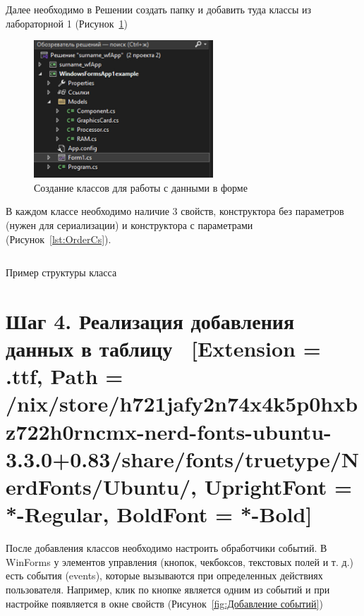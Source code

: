 \documentclass[12pt]{article}
\newcommand{\icon}[1]{\fontspec{UbuntuNerdFont}[Extension = .ttf,
  Path = /nix/store/h721jafy2n74x4k5p0hxbz722h0rncmx-nerd-fonts-ubuntu-3.3.0+0.83/share/fonts/truetype/NerdFonts/Ubuntu/,
  UprightFont = *-Regular,
BoldFont = *-Bold] #1}
\newcommand{\iicon}[1]{{\icon{#1}}}
\renewcommand{\texttt}[1]{{\small\ttfamily #1}}
\numberwithin{listing}{section}
\numberwithin{figure}{section}
\begin{document}
Далее необходимо в Решении создать папку и добавить туда классы из лабораторной 1 (Рисунок~\ref{fig:Создание классов для работы с данными в форме})

\begin{figure}[H]
	\centering
	\includegraphics[width=0.6\textwidth]{fig/image 5.jpg}
	\caption{Создание классов для работы с данными в форме}
	\label{fig:Создание классов для работы с данными в форме}
\end{figure}

В каждом классе необходимо наличие 3 свойств, конструктора без параметров (нужен для сериализации) и конструктора с параметрами (Рисунок~\ref{lst:OrderCs}).

\begin{listing}[H]
	\inputminted[firstline = 9]{csharp}{../../2lab/surname_wfApp/Models/Component.cs}
	\caption{Пример структуры класса}
	\label{lst:OrderCs}
\end{listing}

\newpage

\section{Шаг 4. Реализация добавления данных в таблицу \ \texorpdfstring{{\small{\iicon{}}}}{}}

После добавления классов необходимо настроить обработчики событий.
В \texttt{WinForms} у элементов управления (кнопок, чекбоксов, текстовых полей и т. д.) есть события (\texttt{events}), которые вызываются при определенных действиях пользователя.
Например, клик по кнопке является одним из событий и при настройке появляется в окне свойств (Рисунок~\ref{fig:Добавление событий})
\end{document}
